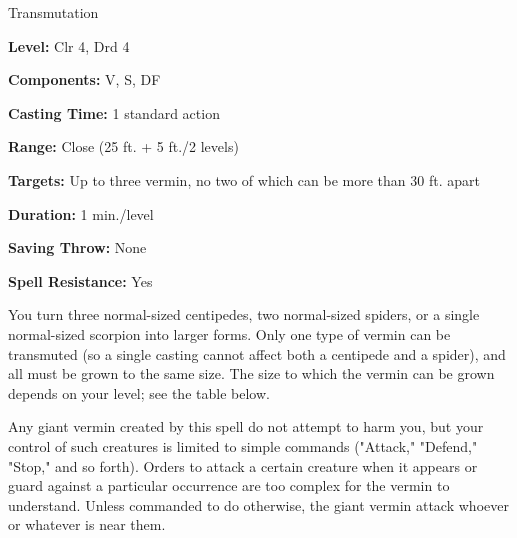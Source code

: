 
Transmutation

\textbf{Level:} Clr 4, Drd 4

\textbf{Components:} V, S, DF

\textbf{Casting Time:} 1 standard action

\textbf{Range:} Close (25 ft. + 5 ft./2 levels)

\textbf{Targets:} Up to three vermin, no two of which can be more than 30 ft. apart

\textbf{Duration:} 1 min./level

\textbf{Saving Throw:} None

\textbf{Spell Resistance:} Yes

You turn three normal-sized centipedes, two normal-sized spiders, or a single normal-sized 
scorpion into larger forms. Only one type of vermin can be transmuted (so a single 
casting cannot affect both a centipede and a spider), and all must be grown to 
the same size. The size to which the vermin can be grown depends on your level; 
see the table below.

Any giant vermin created by this spell do not attempt to harm you, but your control 
of such creatures is limited to simple commands ("Attack," "Defend," "Stop," 
and so forth). Orders to attack a certain creature when it appears or guard against 
a particular occurrence are too complex for the vermin to understand. Unless commanded 
to do otherwise, the giant vermin attack whoever or whatever is near them.


